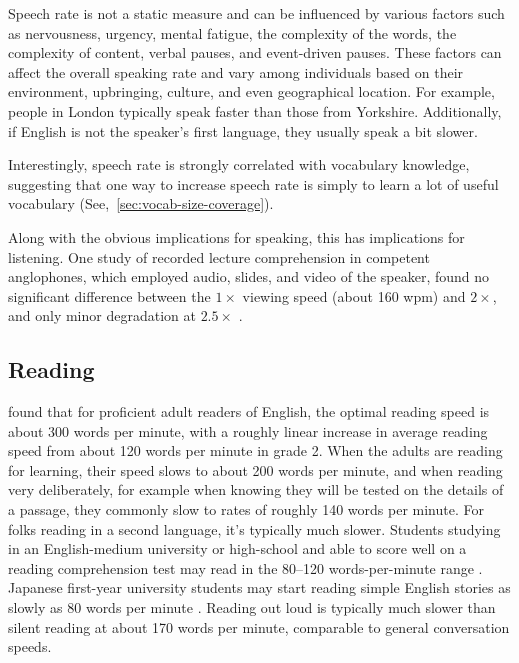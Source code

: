 Speech rate is not a static measure and can be influenced by various factors such as nervousness, urgency, mental fatigue, the complexity of the words, the complexity of content, verbal pauses, and event-driven pauses. These factors can affect the overall speaking rate and vary among individuals based on their environment, upbringing, culture, and even geographical location. For example, people in London typically speak faster than those from Yorkshire. Additionally, if English is not the speaker's first language, they usually speak a bit slower.

Interestingly, speech rate is strongly correlated with vocabulary knowledge, suggesting that one way to increase speech rate is simply to learn a lot of useful vocabulary (See,~\ref{sec:vocab-size-coverage}).

Along with the obvious implications for speaking, this has implications for listening. One study of recorded lecture comprehension in competent anglophones, which employed audio, slides, and video of the speaker, found no significant difference between the $1\times$ viewing speed (about 160 wpm) and $2\times$, and only minor degradation at $2.5\times$ \citep{Murphy2022}.

\subsection{Reading}

\citet{Carver1992} found that for proficient adult readers of English, the optimal reading speed is about 300 words per minute, with a roughly linear increase in average reading speed from about 120 words per minute in grade 2. When the adults are reading for learning, their speed slows to about 200 words per minute, and when reading very deliberately, for example when knowing they will be tested on the details of a passage, they commonly slow to rates of roughly 140 words per minute. For folks reading in a second language, it's typically much slower. Students studying in an English-medium university or high-school and able to score well on a reading comprehension test may read in the 80--120 words-per-minute range \citep[292]{Grabe2009}. Japanese first-year university students may start reading simple English stories as slowly as 80 words per minute \citep{McLean2017}. Reading out loud is typically much slower than silent reading at about 170 words per minute, comparable to general conversation speeds.

